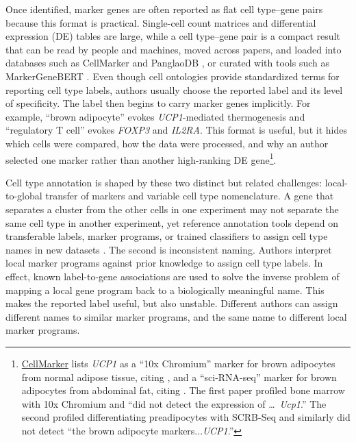 \documentclass[10pt,twocolumn]{article}
\theoremstyle{plain}
\theoremstyle{definition}
\theoremstyle{remark}
\begin{document}
Once identified, marker genes are often reported as flat cell type--gene pairs because this format is practical. Single-cell count matrices and differential expression (DE) tables are large, while a cell type--gene pair is a compact result that can be read by people and machines, moved across papers, and loaded into databases such as CellMarker \citep{Hu2022CellMarker} and PanglaoDB \citep{Franzn_2019}, or curated with tools such as MarkerGeneBERT \citep{Cheng_2024}. Even though cell ontologies provide standardized terms for reporting cell type labels, authors usually choose the reported label and its level of specificity. The label then begins to carry marker genes implicitly. For example, ``brown adipocyte'' evokes \textit{UCP1}-mediated thermogenesis and ``regulatory T cell'' evokes \textit{FOXP3} and \textit{IL2RA}. This format is useful, but it hides which cells were compared, how the data were processed, and why an author selected one marker rather than another high-ranking DE gene\footnote{\href{http://www.bio-bigdata.center/CellMarkerDetail.jsp?species=Human&tissue_type=Adipose\%20tissue&tissue_class=Adipose\%20tissue&cell_name=Brown\%20adipocyte&cell_type=Normal\%20cell&marker=Ucp1&marker_source=Experiment&fourtable=four}{CellMarker} lists \textit{UCP1} as a ``10x Chromium'' marker for brown adipocytes from normal adipose tissue, citing \citep{Zhong2020bone}, and a ``sci-RNA-seq'' marker for brown adipocytes from abdominal fat, citing \citep{Ramirez_2020}. The first paper profiled bone marrow with 10x Chromium and ``did not detect the expression of \ldots\ \textit{Ucp1}.'' The second profiled differentiating preadipocytes with SCRB-Seq and similarly did not detect ``the brown adipocyte markers...\textit{UCP1}.''}.

Cell type annotation is shaped by these two distinct but related challenges: local-to-global transfer of markers and variable cell type nomenclature. A gene that separates a cluster from the other cells in one experiment may not separate the same cell type in another experiment, yet reference annotation tools depend on transferable labels, marker programs, or trained classifiers to assign cell type names in new datasets \citep{Kiselev_2018,Aran_2019,Stuart_2019,Dominguez2022celltypist}. The second is inconsistent naming. Authors interpret local marker programs against prior knowledge to assign cell type labels. In effect, known label-to-gene associations are used to solve the inverse problem of mapping a local gene program back to a biologically meaningful name. This makes the reported label useful, but also unstable. Different authors can assign different names to similar marker programs, and the same name to different local marker programs.
\end{document}
